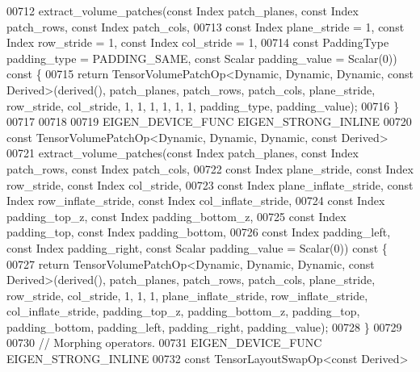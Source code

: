 \begin{DoxyCode}
00712     extract\_volume\_patches(\textcolor{keyword}{const} Index patch\_planes, \textcolor{keyword}{const} Index patch\_rows, \textcolor{keyword}{const} Index patch\_cols,
00713                            \textcolor{keyword}{const} Index plane\_stride = 1, \textcolor{keyword}{const} Index row\_stride = 1, \textcolor{keyword}{const} Index col\_stride
       = 1,
00714                            \textcolor{keyword}{const} PaddingType padding\_type = PADDING\_SAME, \textcolor{keyword}{const} Scalar padding\_value = 
      Scalar(0))\textcolor{keyword}{ const }\{
00715       \textcolor{keywordflow}{return} TensorVolumePatchOp<Dynamic, Dynamic, Dynamic, const Derived>(derived(), patch\_planes, 
      patch\_rows, patch\_cols, plane\_stride, row\_stride, col\_stride, 1, 1, 1, 1, 1, 1, padding\_type, padding\_value);
00716     \}
00717 
00718 
00719     EIGEN\_DEVICE\_FUNC EIGEN\_STRONG\_INLINE
00720     \textcolor{keyword}{const} TensorVolumePatchOp<Dynamic, Dynamic, Dynamic, const Derived>
00721     extract\_volume\_patches(\textcolor{keyword}{const} Index patch\_planes, \textcolor{keyword}{const} Index patch\_rows, \textcolor{keyword}{const} Index patch\_cols,
00722                            \textcolor{keyword}{const} Index plane\_stride, \textcolor{keyword}{const} Index row\_stride, \textcolor{keyword}{const} Index col\_stride,
00723                            \textcolor{keyword}{const} Index plane\_inflate\_stride, \textcolor{keyword}{const} Index row\_inflate\_stride, \textcolor{keyword}{const} Index 
      col\_inflate\_stride,
00724                            \textcolor{keyword}{const} Index padding\_top\_z, \textcolor{keyword}{const} Index padding\_bottom\_z,
00725                            \textcolor{keyword}{const} Index padding\_top, \textcolor{keyword}{const} Index padding\_bottom,
00726                            \textcolor{keyword}{const} Index padding\_left, \textcolor{keyword}{const} Index padding\_right, \textcolor{keyword}{const} Scalar padding\_value 
      = Scalar(0))\textcolor{keyword}{ const }\{
00727       \textcolor{keywordflow}{return} TensorVolumePatchOp<Dynamic, Dynamic, Dynamic, const Derived>(derived(), patch\_planes, 
      patch\_rows, patch\_cols, plane\_stride, row\_stride, col\_stride, 1, 1, 1, plane\_inflate\_stride, row\_inflate\_stride, 
      col\_inflate\_stride, padding\_top\_z, padding\_bottom\_z, padding\_top, padding\_bottom, padding\_left, padding\_right,
       padding\_value);
00728     \}
00729 
00730     \textcolor{comment}{// Morphing operators.}
00731     EIGEN\_DEVICE\_FUNC EIGEN\_STRONG\_INLINE
00732     \textcolor{keyword}{const} TensorLayoutSwapOp<const Derived>

\end{DoxyCode}
